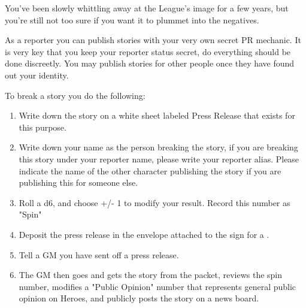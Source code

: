 \documentclass[green]{LRSguildcamp1}
\begin{document}
\name{\gNewspaperPR{}}

You've been slowly whittling away at the League's image for a few years, but you're still not too sure if you want it to plummet into the negatives. 

As a reporter you can publish stories with your very own secret PR mechanic. It is very key that you keep your reporter status secret, do everything should be done discreetly. You may publish stories for other people once they have found out your identity. 

To break a story you do the following:
\begin{enumerate}
\item Write down the story on a white sheet labeled Press Release that exists for this purpose. 
\item Write down your name as the person breaking the story, if you are breaking this story under your reporter name, please write your reporter alias. Please indicate the name of the other character publishing the story if you are publishing this for someone else. 
\item Roll a d6, and choose +/- 1 to modify your result. Record this number as "Spin"
\item Deposit the press release in the envelope attached to the sign for a \sWallPhone{}. 
\item Tell a GM you have sent off a press release.
\item The GM then goes and gets the story from the packet, reviews the spin number, modifies a "Public Opinion" number that represents general public opinion on Heroes, and publicly posts the story on a news board. 
\end{enumerate}




\end{document}
